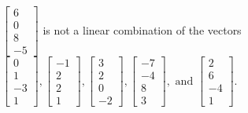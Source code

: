 \begin{exercise}
\begin{exerciseStatement}
  \end{exerciseStatement}
  \begin{exerciseAnswer}
   \(\left[\begin{array}{c}
6 \\
0 \\
8 \\
-5
\end{array}\right]\) 
  	 is not  
	a linear combination of the vectors \(\left[\begin{array}{c}
0 \\
1 \\
-3 \\
1
\end{array}\right] , \left[\begin{array}{c}
-1 \\
2 \\
2 \\
1
\end{array}\right] , \left[\begin{array}{c}
3 \\
2 \\
0 \\
-2
\end{array}\right] , \left[\begin{array}{c}
-7 \\
-4 \\
8 \\
3
\end{array}\right] , \text{ and } \left[\begin{array}{c}
2 \\
6 \\
-4 \\
1
\end{array}\right]\).

	
  


  \end{exerciseAnswer}
\end{exercise}